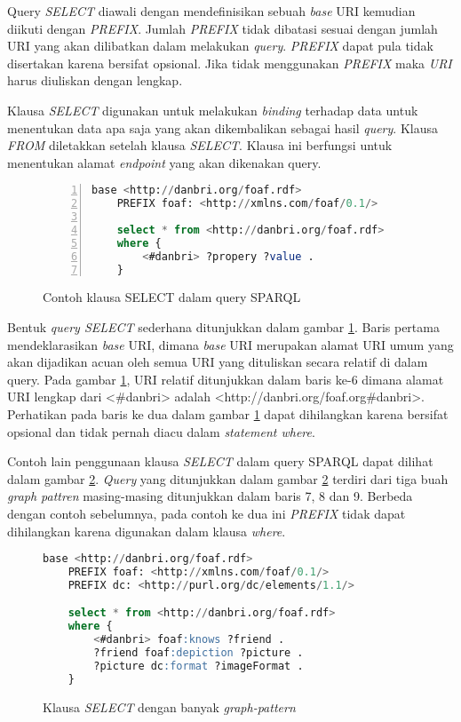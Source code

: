 Query \emph{SELECT} diawali dengan mendefinisikan sebuah \emph{base} URI kemudian diikuti dengan \emph{PREFIX}. Jumlah \emph{PREFIX} tidak dibatasi sesuai dengan jumlah URI yang akan dilibatkan dalam melakukan \emph{query}. \emph{PREFIX} dapat pula tidak disertakan karena bersifat opsional. Jika tidak menggunakan \emph{PREFIX} maka \emph{URI} harus diuliskan dengan lengkap.

Klausa \emph{SELECT} digunakan untuk melakukan \emph{binding} terhadap data untuk menentukan data apa saja yang akan dikembalikan sebagai hasil \emph{query}. Klausa \emph{FROM} diletakkan setelah klausa \emph{SELECT}. Klausa ini berfungsi untuk menentukan alamat \emph{endpoint} yang akan dikenakan query.

\begin{figure}[hb]
	\centering
	\begin{lstlisting}[language=SQL, numbers=left]
	base <http://danbri.org/foaf.rdf>
	PREFIX foaf: <http://xmlns.com/foaf/0.1/>

	select * from <http://danbri.org/foaf.rdf>
	where {
		<#danbri> ?propery ?value .
	}
	\end{lstlisting}
	\caption{Contoh klausa SELECT dalam query SPARQL}
	\label{fig:sparql_select_1}
\end{figure}

Bentuk \emph{query SELECT} sederhana ditunjukkan dalam gambar \ref{fig:sparql_select_1}. Baris pertama mendeklarasikan \emph{base} URI, dimana \emph{base} URI merupakan alamat URI umum yang akan dijadikan acuan oleh semua URI yang dituliskan secara relatif di dalam query. Pada gambar \ref{fig:sparql_select_1}, URI relatif ditunjukkan dalam baris ke-6 dimana alamat URI lengkap dari <\#danbri> adalah <http://danbri.org/foaf.org\#danbri>. Perhatikan pada baris ke dua dalam gambar \ref{fig:sparql_select_1} dapat dihilangkan karena bersifat opsional dan tidak pernah diacu dalam \emph{statement where}.

Contoh lain penggunaan klausa \emph{SELECT} dalam query SPARQL dapat dilihat dalam gambar \ref{fig:sparql_select_2}. \emph{Query} yang ditunjukkan dalam gambar \ref{fig:sparql_select_2} terdiri dari tiga buah \emph{graph pattren} masing-masing ditunjukkan dalam baris 7, 8 dan 9. Berbeda dengan contoh sebelumnya, pada contoh ke dua ini \emph{PREFIX} tidak dapat dihilangkan karena digunakan dalam klausa \emph{where}. 

\begin{figure}[ht]
	\centering
	\begin{lstlisting}[language=SQL]
	base <http://danbri.org/foaf.rdf>
	PREFIX foaf: <http://xmlns.com/foaf/0.1/>
	PREFIX dc: <http://purl.org/dc/elements/1.1/>

	select * from <http://danbri.org/foaf.rdf>
	where {
		<#danbri> foaf:knows ?friend .
		?friend foaf:depiction ?picture .
		?picture dc:format ?imageFormat .
	}
	\end{lstlisting}
	\caption{Klausa \emph{SELECT} dengan banyak \emph{graph-pattern}}
	\label{fig:sparql_select_2}
\end{figure}

